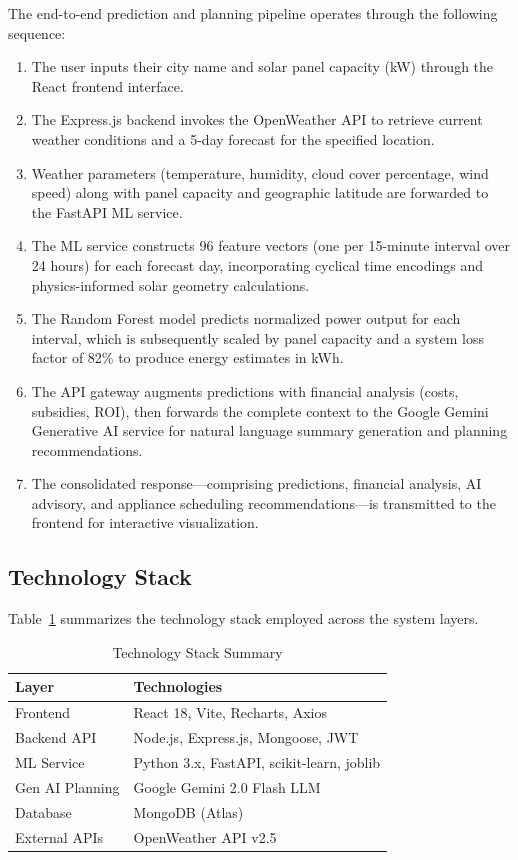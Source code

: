 \documentclass[conference]{IEEEtran}
\renewcommand{\small}{\fontsize{10}{14}\selectfont}
\begin{document}
The end-to-end prediction and planning pipeline operates through the following sequence:

\begin{enumerate}
\item The user inputs their city name and solar panel capacity (kW) through the React frontend interface.
\item The Express.js backend invokes the OpenWeather API to retrieve current weather conditions and a 5-day forecast for the specified location.
\item Weather parameters (temperature, humidity, cloud cover percentage, wind speed) along with panel capacity and geographic latitude are forwarded to the FastAPI ML service.
\item The ML service constructs 96 feature vectors (one per 15-minute interval over 24 hours) for each forecast day, incorporating cyclical time encodings and physics-informed solar geometry calculations.
\item The Random Forest model predicts normalized power output for each interval, which is subsequently scaled by panel capacity and a system loss factor of 82\% to produce energy estimates in kWh.
\item The API gateway augments predictions with financial analysis (costs, subsidies, ROI), then forwards the complete context to the Google Gemini Generative AI service for natural language summary generation and planning recommendations.
\item The consolidated response---comprising predictions, financial analysis, AI advisory, and appliance scheduling recommendations---is transmitted to the frontend for interactive visualization.
\end{enumerate}

\subsection{Technology Stack}

Table~\ref{tab:tech} summarizes the technology stack employed across the system layers.

\begin{table}[H]
\caption{Technology Stack Summary}
\begin{center}
\small
\begin{tabular}{|l|l|}
\hline
\textbf{Layer} & \textbf{Technologies} \\
\hline
Frontend & React 18, Vite, Recharts, Axios \\
\hline
Backend API & Node.js, Express.js, Mongoose, JWT \\
\hline
ML Service & Python 3.x, FastAPI, scikit-learn, joblib \\
\hline
Gen AI Planning & Google Gemini 2.0 Flash LLM \\
\hline
Database & MongoDB (Atlas) \\
\hline
External APIs & OpenWeather API v2.5 \\
\hline
\end{tabular}
\label{tab:tech}
\end{center}
\end{table}
\end{document}
